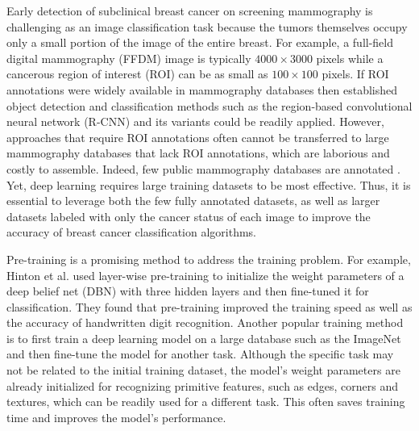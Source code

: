 \documentclass[12pt,letterpaper]{article}
\begin{document}
Early detection of subclinical breast cancer on screening mammography is challenging as an image classification task because the tumors themselves occupy only a small portion of the image of the entire breast. For example, a full-field digital mammography (FFDM) image is typically $4000 \times 3000$ pixels while a cancerous region of interest (ROI) can be as small as $100 \times 100$ pixels. If ROI annotations were widely available in mammography databases then established object detection and classification methods such as the region-based convolutional neural network (R-CNN) \cite{girshick_rich_2014} and its variants \cite{girshick_fast_2015,ren_faster_2015,dai_r-fcn_2016} could be readily applied. However, approaches that require ROI annotations \cite{jamieson_breast_2012,arevalo_convolutional_2015,carneiro_unregistered_2015,dhungel_automated_2015,ertosun_probabilistic_2015,akselrod-ballin_region_2016,arevalo_representation_2016,levy_breast_2016,dhungel_automated_2016,becker_deep_2017,ribli_detecting_2017} often cannot be transferred to large mammography databases that lack ROI annotations, which are laborious and costly to assemble. Indeed, few public mammography databases are annotated \cite{moreira_inbreast_2012}. Yet, deep learning requires large training datasets to be most effective. Thus, it is essential to leverage both the few fully annotated datasets, as well as larger datasets labeled with only the cancer status of each image to improve the accuracy of breast cancer classification algorithms.

Pre-training is a promising method to address the training problem. For example, Hinton et al. \cite{hinton_fast_2006} used layer-wise pre-training to initialize the weight parameters of a deep belief net (DBN) with three hidden layers and then fine-tuned it for classification. They found that pre-training improved the training speed as well as the accuracy of handwritten digit recognition. Another popular training method is to first train a deep learning model on a large database such as the ImageNet \cite{russakovsky_imagenet_2015} and then fine-tune the model for another task. Although the specific task may not be related to the initial training dataset, the model's weight parameters are already initialized for recognizing primitive features, such as edges, corners and textures, which can be readily used for a different task. This often saves training time and improves the model's performance.
\end{document}
